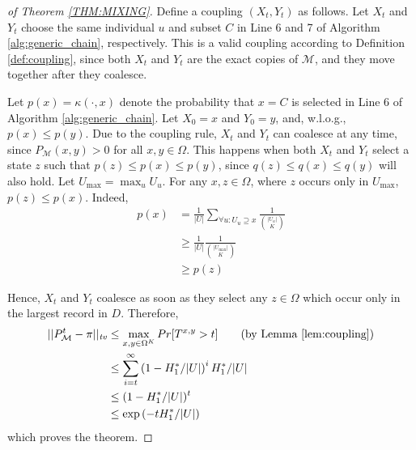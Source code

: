 \documentclass{acm_proc_article-sp}
\theoremstyle{plain}
\theoremstyle{plain}
\theoremstyle{plain}
\theoremstyle{plain}
\theoremstyle{plain}
\theoremstyle{plain}
\newcommand{\mc}[1]{\mathcal{#1}}
\begin{document}
\begin{proof}[of Theorem \ref{THM:MIXING}]
Define a coupling $(X_t, Y_t)$ as follows. Let $X_t$ and $Y_t$ choose the same individual $u$ and subset $C$ in Line 6 and 7 of Algorithm \ref{alg:generic_chain}, respectively. This is a valid coupling according to Definition \ref{def:coupling}, since both $X_t$ and $Y_t$ are the exact copies of $\mathcal{M}$, and they move together after they coalesce.

Let $p(x) = \kappa(\cdot, x)$ denote the probability that $x=C$ is selected in Line 6 of Algorithm \ref{alg:generic_chain}.
Let $X_0=x$ and $Y_0 = y$, and, w.l.o.g., $p(x) \leq p(y)$. Due to the coupling rule, $X_t$ and $Y_t$ can coalesce at any time, since $P_\mathcal{M}(x,y) > 0$ for all $x,y \in \Omega$. This happens when both $X_t$ and $Y_t$ select a state $z$ such that $p(z) \leq p(x) \leq p(y)$, since $q(z) \leq q(x) \leq q(y)$ will also hold. Let $U_{\max} = \max_u U_u$. For any $x, z \in \Omega$, where $z$ occurs only in $U_{\max}$, $p(z) \leq p(x)$.
Indeed, 
\begin{align*}
\label{ineq:1}
p(x) &= \frac{1}{|U|}\sum_{\forall u : U_u \supseteq x}  \frac{1}{{|U_u| \choose K}} \\
& \geq\frac{1}{|U|} \frac{1}{{|U_{\max}| \choose K}}\\
&\geq  p(z) 
\end{align*}

Hence, $X_t$ and $Y_t$ coalesce as soon as they select any  $z \in \Omega$ which occur only in the largest record in $D$. Therefore,
\begin{align}
||P^t_{\mc{M}} - \pi||_{\mathit{tv}} &\leq \max_{x,y \in \Omega^K}Pr[T^{x,y} > t]  \tag{by Lemma \ref{lem:coupling}} \\
&\leq \sum_{i=t}^{\infty} \left(1-H_1^*/ |U|\right)^i  H_1^*/|U| \notag \\
&\leq (1 - H_1^*/|U|)^t \notag \\
&\leq \exp\left(-tH_1^*/|U|\right) \notag
\end{align}
which proves the theorem.
\end{proof}

\balancecolumns
\end{document}
